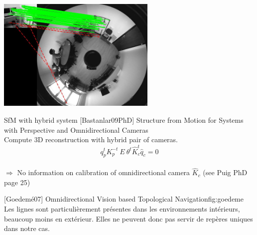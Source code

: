 \newpage

\begin{minipage}[c]{0.5\textwidth}
\centering
\includegraphics[width=3.0in]{images/Bastanlar09.png}
\label{fig:sample_figure}
\end{minipage}
\begin{minipage}[c]{0.5\textwidth}


      SfM with hybrid system [Bastanlar09PhD] Structure from Motion for Systems with Perspective and Omnidirectional Cameras\\
        Compute 3D reconstruction with hybrid pair of cameras.\\
        $$q_p^t K_p^{-t} ~E~ \theta^t \hat{K}_c^t \hat{q}_c = 0$$\\
        $\Rightarrow$ No information on calibration of omnidirectional camera $\hat{K}_c$ (see Puig PhD page 25)
    \end{minipage}
  
        {[Goedemé07] Omnidirectional Vision based Topological Navigation}{fig:goedeme}
        Les lignes sont particulièrement présentes dans les environnements intérieurs, beaucoup moins en extérieur. Elles ne peuvent donc pas servir de repères uniques dans notre cas.

